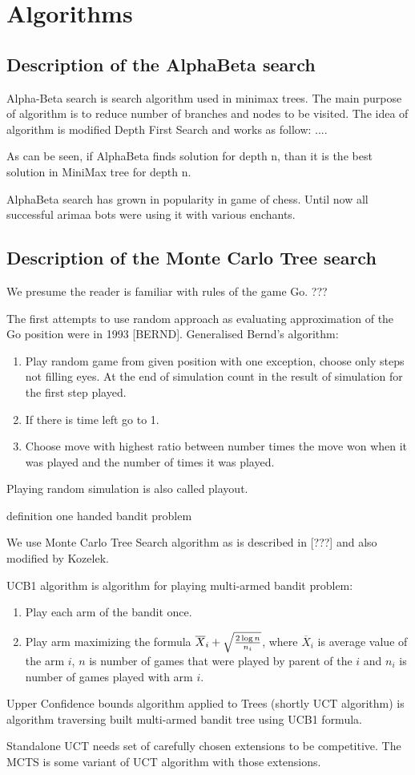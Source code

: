
\chapter{Algorithms}

\section{Description of the AlphaBeta search}
Alpha-Beta search is search algorithm used in minimax trees. The main purpose
of algorithm is to reduce number of branches and nodes to be visited. The idea
of algorithm is modified Depth First Search and works as follow:
....

As can be seen, if AlphaBeta finds solution for depth n, than it is the best
solution in MiniMax tree for depth n.

AlphaBeta search has grown in popularity in game of chess. Until now all
successful arimaa bots were using it with various enchants.


\section{Description of the Monte Carlo Tree search}
We presume the reader is familiar with rules of the game Go. {???}

The first attempts to use random approach as evaluating approximation of the Go
position were in 1993 [BERND]. Generalised Bernd's algorithm:

\begin{enumerate}
\item Play random game from given position with one exception, choose only
	  steps not filling eyes. At the end of simulation count in the result of
	  simulation for the first step played.
\item If there is time left go to 1.
\item Choose move with highest ratio between number times the move won when it
	  was played and the number of times it was played.
\end{enumerate}

Playing random simulation is also called playout.

definition one handed bandit problem

We use Monte Carlo Tree Search algorithm as is described in [???] and also
modified by Kozelek.


UCB1 algorithm is algorithm for playing multi-armed bandit problem:

\begin{enumerate}
\item Play each arm of the bandit once.
\item Play arm maximizing the formula $\overline X_i + \sqrt{2 \log n \over n_i}$,
	  where $\overline X_i$ is average value of the arm $i$, $n$ is number
	  of games that were played by parent of the $i$ and $n_i$ is number of
	  games played with arm $i$.
\end{enumerate}

Upper Confidence bounds algorithm applied to Trees (shortly UCT algorithm) is
algorithm traversing built multi-armed bandit tree using UCB1 formula.

	

Standalone UCT needs set of carefully chosen extensions to be competitive. The
MCTS is some variant of UCT algorithm with those extensions.
